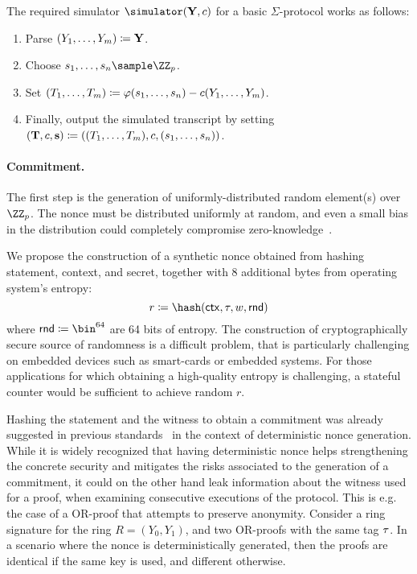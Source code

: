 \documentclass[runningheads,11pt]{article}
\begin{document}
\begin{enumerate}
    The required simulator $\simulator(\vec \statement,c)$ for a basic $\Sigma$-protocol works as follows:
    \begin{enumerate}
      \item
        Parse $(Y_1,\dots,Y_m)\coloneqq \mathbf {Y}$.
      \item\label{item:basic:sim:s}
        Choose $\response_1,\dots,\response_n\sample\ZZ_p$.
      \item
        Set $(T_1,\dots,T_m) \coloneqq \varphi(s_1,\dots,s_n) - c(Y_1,\dots,Y_m)$.
      \item
        Finally, output the simulated transcript by setting $(\mathbf {T},c,\mathbf {s})\coloneqq((T_1,\dots,T_m),c,(s_1,\dots,s_n))$.
    \end{enumerate}
\end{enumerate}



\paragraph{Commitment.} The first step is the generation of uniformly-distributed random element(s) over $\ZZ_p$. The nonce must be distributed uniformly at random, and even a small bias in the distribution could completely compromise zero-knowledge~\cite{lattice-attack,bleichenbacher,CCS:ANTTY20}.

We propose the construction of a synthetic nonce obtained from hashing statement, context, and secret, together with 8 additional bytes from operating system's entropy:
\[
  r \defeq \hash(\ctx, \stag, \witness, \mathsf{rnd})
\]
where $\mathsf{rnd} \defeq \bin^{64}$ are 64 bits of entropy.
The construction of cryptographically secure source of randomness is a difficult problem, that is particularly challenging on embedded devices such as smart-cards or embedded systems. For those applications for which obtaining a high-quality entropy is challenging, a stateful counter would be sufficient to achieve random $r$.

Hashing the statement and the witness to obtain a commitment was already suggested in previous standards~\cite{rfc6979} in the context of deterministic nonce generation.
While it is widely recognized that having deterministic nonce helps strengthening the concrete security  and mitigates the risks associated to the generation of a commitment, it could on the other hand leak information about the witness used for a proof, when examining consecutive executions of the protocol. This is e.g. the case of a OR-proof that attempts to preserve anonymity.
Consider a ring signature for the ring \(R = (Y_0 , Y_1)\),
and two OR-proofs with the same tag $\tau$.  In a scenario where the nonce is deterministically generated, then the proofs are identical if the same key is used, and different otherwise.
\end{document}
